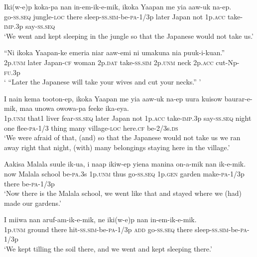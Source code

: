 {\ea\label{ex:a:x17}
\gll  Iki(w-e)p  koka-pa  nan  in-em-ik-e-mik,       ikoka  Yaapan  me  yia  aaw-uk  na-ep. \\
go-\textsc{ss.seq}  jungle-\textsc{loc}  there  sleep-\textsc{ss}.\textsc{sim}-be-\textsc{pa}-1/3p later  Japan  not  1p.\textsc{acc}  take-\textsc{imp}.3p  say-\textsc{ss.seq} \\
\glt ‘We went and kept sleeping in the jungle so that the Japanese would not take us.’ \\
\z


\ea\label{ex:a:x18}
\gll  “Ni  ikoka  Yaapan-ke  emeria  niar  aaw-emi   ni  umakuna  nia  puuk-i-kuan.” \\
2p.\textsc{unm}  later  Japan-\textsc{cf}  woman  2p.\textsc{dat}  take-\textsc{ss}.\textsc{sim} 2p.\textsc{unm}  neck  2p.\textsc{acc}  cut-Np-\textsc{fu}.3p \\
\glt ‘ “Later the Japanese will take your wives and cut your necks.” ’ \\
\z


\ea\label{ex:a:x19}
\gll  I  nain  kema  tooton-ep,  ikoka  Yaapan  me  yia       aaw-uk  na-ep  uura  kuisow  baurar-e-mik, maa  unowa  owowa-pa  feeke  ika-eya. \\
1p.\textsc{unm}  that1  liver  fear-\textsc{ss.seq}  later  Japan  not  1p.\textsc{acc} take-\textsc{imp}.3p  say-\textsc{ss.seq}  night  one  flee-\textsc{pa}-1/3 thing  many  village-\textsc{loc}  here.\textsc{cf}  be-2/3s.\textsc{ds}\\
\glt ‘We were afraid of that, (and) so that the Japanese would not take us we ran away right that night, (with) many belongings staying here in the village.’ \\
\z


\ea\label{ex:a:x20}
\gll  Aakisa  Malala  suule  ik-ua,  i  naap  ikiw-ep yiena  manina  on-a-mik  nan  ik-e-mik. \\
now  Malala  school  be-\textsc{pa}.3s  1p.\textsc{unm}  thus  go-\textsc{ss.seq} 1p.\textsc{gen}  garden  make-\textsc{pa}-1/3p  there  be-\textsc{pa}-1/3p \\
\glt ‘Now there is the Malala school, we went like that and stayed where we (had) made our gardens.’ \\
\z


\ea\label{ex:a:x21}
\gll  I  miiwa  nan  aruf-am-ik-e-mik,  ne  iki(w-e)p  nan  in-em-ik-e-mik. \\
1p.\textsc{unm}  ground  there  hit-\textsc{ss}.\textsc{sim}-be-\textsc{pa}-1/3p  \textsc{add}  go-\textsc{ss.seq} there  sleep-\textsc{ss}.\textsc{sim}-be-\textsc{pa}-1/3p \\
\glt ‘We kept tilling the soil there, and we went and kept sleeping there.’ \\
\z


}
